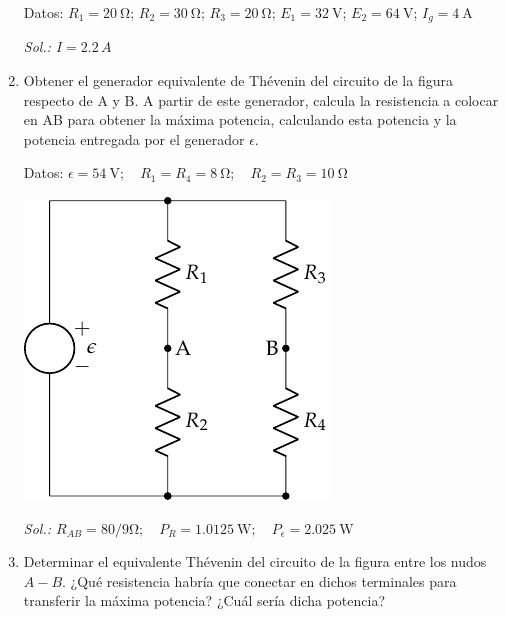\begin{enumerate}
  Datos: $R_1 = \qty{20}{\ohm}$; $R_2 = \qty{30}{\ohm}$; $R_3 = \qty{20}{\ohm}$; $E_1 = \qty{32}{\volt}$; $E_2 = \qty{64}{\volt}$; $I_g = \qty{4}{\ampere}$

  \emph{Sol.: $I=2.2\,A$}

\item Obtener el generador equivalente de Thévenin del circuito de la
  figura respecto de A y B. A partir de este generador, calcula la
  resistencia a colocar en AB para obtener la máxima potencia,
  calculando esta potencia y la potencia entregada por el generador
  $\epsilon$.

  Datos:
  $\epsilon = \qty{54}{\volt};\quad R_1 = R_4 = \qty{8}{\ohm};\quad
  R_2 = R_3 = \qty{10}{\ohm}$

  \begin{center}
    \includegraphics{../figs/Thevenin2}
  \end{center}

    \emph{Sol.:
      $R_{AB} = 80/9\si{\ohm}; \quad P_R = \qty{1.0125}{\watt}; \quad
      P_\epsilon = \qty{2.025}{\watt}$}

  \item Determinar el equivalente Thévenin del circuito de la figura
    entre los nudos $A-B$. ¿Qué resistencia habría que conectar en
    dichos terminales para transferir la máxima potencia? ¿Cuál sería
    dicha potencia?
    

\end{enumerate}
